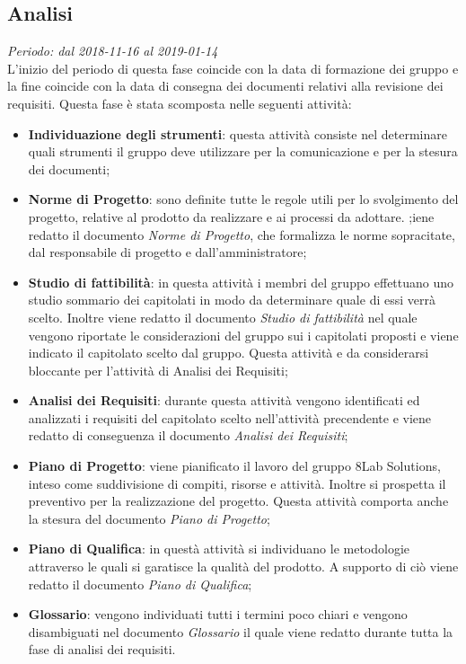 \subsection{Analisi}
\textit{Periodo: dal 2018-11-16 al 2019-01-14}\\
L'inizio del periodo di questa fase coincide con la data di formazione dei 
gruppo e la fine coincide con la data di consegna dei documenti relativi alla 
revisione dei requisiti. Questa fase è stata scomposta nelle seguenti attività:
\begin{itemize}
	\item \textbf{Individuazione degli strumenti}: questa attività consiste nel 
	determinare quali strumenti il gruppo deve utilizzare per la comunicazione 
	e per la stesura dei documenti; 
	\item \textbf{Norme di Progetto}: sono definite tutte le regole utili per lo svolgimento del progetto, relative al prodotto da realizzare e ai processi da adottare. ;iene redatto il documento \textit{Norme 
	di Progetto}, che formalizza le norme sopracitate, dal responsabile di progetto e dall'amministratore;
	\item \textbf{Studio di fattibilità}: in questa attività i membri del gruppo effettuano uno studio sommario dei capitolati in modo da determinare quale di essi verrà scelto. Inoltre viene redatto il documento 
	\textit{Studio di fattibilità} nel quale vengono riportate le considerazioni del gruppo sui i capitolati proposti e viene indicato il capitolato scelto dal gruppo. 
	Questa attività e da considerarsi bloccante per l'attività di Analisi dei 
	Requisiti;
	\item \textbf{Analisi dei Requisiti}: durante questa attività vengono 
	identificati ed analizzati i requisiti del capitolato scelto nell'attività 
	precendente e viene redatto di conseguenza il documento \textit{Analisi dei 
	Requisiti};
	\item \textbf{Piano di Progetto}: viene pianificato il 
	lavoro del gruppo 8Lab Solutions, inteso come suddivisione di compiti, 
	risorse e attività. Inoltre si prospetta il preventivo per la realizzazione 
	del progetto. Questa attività comporta anche la stesura 
	del documento \textit{Piano di Progetto};
	\item \textbf{Piano di Qualifica}: in questà attività si individuano le 
	metodologie attraverso le quali si garatisce la qualità del prodotto. A supporto di ciò viene redatto il documento \textit{Piano di Qualifica}; 
	\item \textbf{Glossario}: vengono individuati tutti i termini poco chiari e 
	vengono disambiguati nel documento \textit{Glossario} il quale viene 
	redatto durante tutta la fase di analisi dei requisiti.
\end{itemize}

